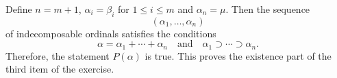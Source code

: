\documentclass{article}
\begin{document}
\begin{solution}
  Define \(n = m+1\), \(\alpha_i = \beta_i\) for \(1 \leq i \leq m\)
  and \(\alpha_n = \mu\).  Then the sequence
  \begin{displaymath}
    (\alpha_1, \dotsc, \alpha_n)
  \end{displaymath}
  of indecomposable ordinals satisfies the conditions
  \begin{displaymath}
    \alpha = \alpha_1 + \dotsb + \alpha_n
    \quad \text{and} \quad
    \alpha_1 \supset \dotsb \supset \alpha_n.
  \end{displaymath}
  Therefore, the statement \(P(\alpha)\) is true.  This proves the
  existence part of the third item of the exercise.
\end{solution}

\bibsection
\end{document}

